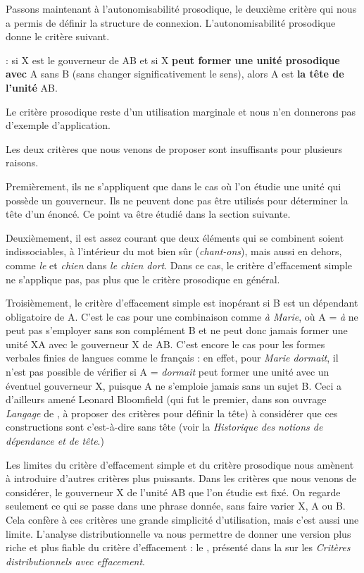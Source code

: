 Passons maintenant à l’autonomisabilité prosodique, le deuxième critère qui nous a permis de définir la structure de connexion. L’autonomisabilité prosodique donne le critère suivant.

{: si X est le gouverneur de AB et si X \textbf{peut former une unité prosodique avec} A sans B (sans changer significativement le sens), alors A est \textbf{la tête de l’unité} AB.}

Le critère prosodique reste d'un utilisation marginale et nous n'en donnerons pas d'exemple d'application.

Les deux critères que nous venons de proposer sont insuffisants pour plusieurs raisons.

Premièrement, ils ne s’appliquent que dans le cas où l’on étudie une unité qui possède un gouverneur. Ils ne peuvent donc pas être utilisés pour déterminer la tête d’un énoncé. Ce point va être étudié dans la section suivante.

Deuxièmement, il est assez courant que deux éléments qui se combinent soient indissociables, à l’intérieur du mot bien sûr (\textit{chant-ons}), mais aussi en dehors, comme \textit{le} et \textit{chien} dans \textit{le chien dort}. Dans ce cas, le critère d’effacement simple ne s’applique pas, pas plus que le critère prosodique en général.

Troisièmement, le critère d’effacement simple est inopérant si B est un dépendant obligatoire de A. C’est le cas pour une combinaison comme \textit{à Marie}, où A = \textit{à} ne peut pas s’employer sans son complément B et ne peut donc jamais former une unité XA avec le gouverneur X de AB. C’est encore le cas pour les formes verbales finies de langues comme le français : en effet, pour \textit{Marie dormait}, il n’est pas possible de vérifier si A = \textit{dormait} peut former une unité avec un éventuel gouverneur X, puisque A ne s’emploie jamais sans un sujet B. Ceci a d’ailleurs amené Leonard Bloomfield (qui fut le premier, dans son ouvrage \textit{Langage} de \citeyear{bloomfield1933language}, à proposer des critères pour définir la tête) à considérer que ces constructions sont  c’est-à-dire sans tête (voir la  \textit{Historique des notions de dépendance et de tête}.)

Les limites du critère d’effacement simple et du critère prosodique nous amènent à introduire d’autres critères plus puissants. Dans les critères que nous venons de considérer, le gouverneur X de l’unité AB que l’on étudie est fixé. On regarde seulement ce qui se passe dans une phrase donnée, sans faire varier X, A ou B. Cela confère à ces critères une grande simplicité d’utilisation, mais c’est aussi une limite. L’analyse distributionnelle va nous permettre de donner une version plus riche et plus fiable du critère d’effacement : le , présenté dans la  sur les \textit{Critères distributionnels avec effacement}.

